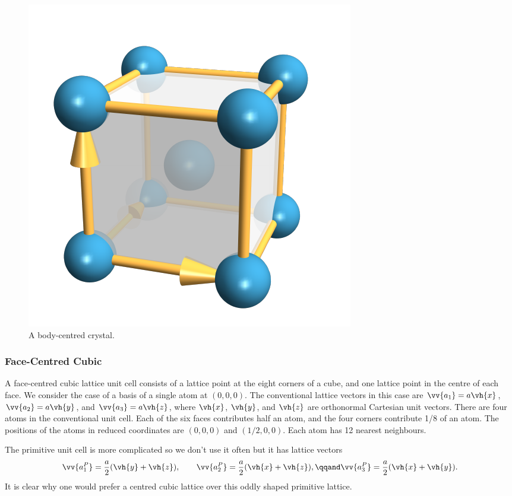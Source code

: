 \documentclass[fleqn]{NotesClass}
\begin{document}
    \begin{figure}
        \includegraphics{images/bcc-crystal.pdf}
        \caption{A body-centred crystal.}
    \end{figure}
    
    \subsubsection{Face-Centred Cubic}
    A face-centred cubic lattice unit cell consists of a lattice point at the eight corners of a cube, and one lattice point in the centre of each face.
    We consider the case of a basis of a single atom at \((0, 0, 0)\).
    The conventional lattice vectors in this case are \(\vv{a_1} = a\vh{x}\), \(\vv{a_2} = a\vh{y}\), and \(\vv{a_3} = a\vh{z}\), where \(\vh{x}\), \(\vh{y}\), and \(\vh{z}\) are orthonormal Cartesian unit vectors.
    There are four atoms in the conventional unit cell.
    Each of the six faces contributes half an atom, and the four corners contribute 1/8 of an atom.
    The positions of the atoms in reduced coordinates are \((0, 0, 0)\) and \((1/2, 0, 0)\).
    Each atom has 12 nearest neighbours.
    
    The primitive unit cell is more complicated so we don't use it often but it has lattice vectors
    \begin{equation}
        \vv{a_1^P} = \frac{a}{2}(\vh{y} + \vh{z}), \qquad \vv{a_2^P} = \frac{a}{2}(\vh{x} + \vh{z}), \qqand \vv{a_3^P} = \frac{a}{2}(\vh{x} + \vh{y}).
    \end{equation}
    It is clear why one would prefer a centred cubic lattice over this oddly shaped primitive lattice.
    
\end{document}
